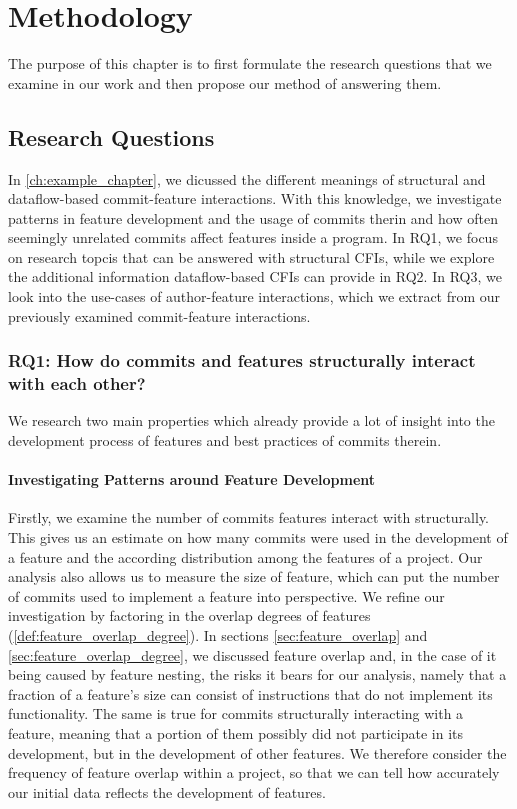 \chapter{Methodology}\label{ch:methodology}

The purpose of this chapter is to first formulate the research questions that we examine in our work and then propose our method of answering them.

\section{Research Questions}\label{sec:research_questions}

In \autoref{ch:example_chapter}, we dicussed the different meanings of structural and dataflow-based commit-feature interactions.
With this knowledge, we investigate patterns in feature development and the usage of commits therin and how often seemingly unrelated commits affect features inside a program.
In RQ1, we focus on research topcis that can be answered with structural CFIs, while we explore the additional information dataflow-based CFIs can provide in RQ2.
In RQ3, we look into the use-cases of author-feature interactions, which we extract from our previously examined commit-feature interactions.

\subsection*{\textbf{RQ1: How do commits and features structurally interact with each other?}}

We research two main properties which already provide a lot of insight into the development process of features and best practices of commits therein.

\subsubsection*{Investigating Patterns around Feature Development}

Firstly, we examine the number of commits features interact with structurally. 
This gives us an estimate on how many commits were used in the development of a feature and the according distribution among the features of a project.
Our analysis also allows us to measure the size of feature, which can put the number of commits used to implement a feature into perspective.
We refine our investigation by factoring in the overlap degrees of features (\ref{def:feature_overlap_degree}). 
In sections \ref{sec:feature_overlap} and \ref{sec:feature_overlap_degree}, we discussed feature overlap and, in the case of it being caused by feature nesting, the risks it bears for our analysis, namely that a fraction of a feature's size can consist of instructions that do not implement its functionality.
The same is true for commits structurally interacting with a feature, meaning that a portion of them possibly did not participate in its development, but in the development of other features.
We therefore consider the frequency of feature overlap within a project, so that we can tell how accurately our initial data reflects the development of features.

